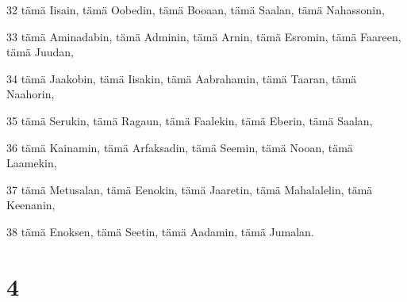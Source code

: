 \par 32 tämä Iisain, tämä Oobedin, tämä Booaan, tämä Saalan, tämä Nahassonin,
\par 33 tämä Aminadabin, tämä Adminin, tämä Arnin, tämä Esromin, tämä Faareen, tämä Juudan,
\par 34 tämä Jaakobin, tämä Iisakin, tämä Aabrahamin, tämä Taaran, tämä Naahorin,
\par 35 tämä Serukin, tämä Ragaun, tämä Faalekin, tämä Eberin, tämä Saalan,
\par 36 tämä Kainamin, tämä Arfaksadin, tämä Seemin, tämä Nooan, tämä Laamekin,
\par 37 tämä Metusalan, tämä Eenokin, tämä Jaaretin, tämä Mahalalelin, tämä Keenanin,
\par 38 tämä Enoksen, tämä Seetin, tämä Aadamin, tämä Jumalan.

\chapter{4}

